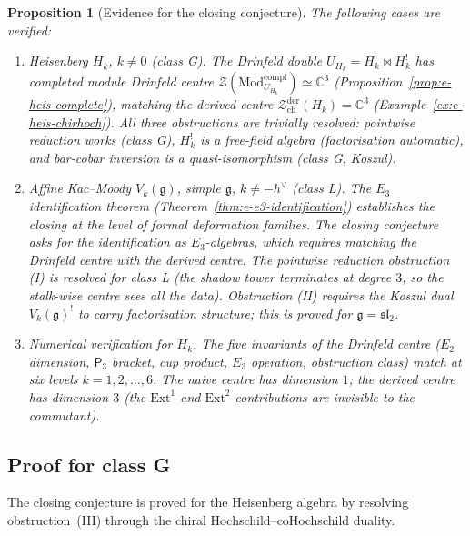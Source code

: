 \documentclass[11pt,reqno]{amsart}
\newtheorem{proposition}[theorem]{Proposition}
\theoremstyle{definition}
\theoremstyle{remark}
\providecommand{\cZ}{\mathcal{Z}}
\providecommand{\fg}{\mathfrak{g}}
\providecommand{\Etwo}{E_2}
\providecommand{\Ethree}{E_3}
\providecommand{\Pthree}{\mathsf{P}_3}
\providecommand{\bC}{\mathbb{C}}
\begin{document}
\begin{proposition}[Evidence for the closing conjecture]
\label{prop:e-evidence}
The following cases are verified:
\begin{enumerate}[label=\textup{(\roman*)}]
\item \emph{Heisenberg $H_k$, $k \neq 0$
 \textup{(}class G\textup{)}.}
 The Drinfeld double $U_{H_k} = H_k \bowtie H_k^!$ has
 completed module Drinfeld centre
 \(\mathcal Z(\mathrm{Mod}^{\mathrm{compl}}_{U_{H_k}})\simeq \bC^3\)
 (Proposition~\ref{prop:e-heis-complete}), matching the derived centre
 $\cZ^{\mathrm{der}}_{\mathrm{ch}}(H_k) = \bC^3$
 (Example~\ref{ex:e-heis-chirhoch}). All three obstructions
 are trivially resolved: pointwise reduction works (class G),
 $H_k^!$ is a free-field algebra (factorisation automatic),
 and bar-cobar inversion is a quasi-isomorphism (class G,
 Koszul).

\item \emph{Affine Kac--Moody $V_k(\fg)$, simple $\fg$,
 $k \neq -h^\vee$ \textup{(}class L\textup{)}.}
 The $\Ethree$ identification theorem
 (Theorem~\ref{thm:e-e3-identification}) establishes the
 closing at the level of formal deformation families. The
 closing conjecture asks for the identification as
 $\Ethree$-algebras, which requires matching the
 Drinfeld centre with the derived centre. The pointwise
 reduction obstruction (I) is resolved for class L (the
 shadow tower terminates at degree $3$, so the stalk-wise
 centre sees all the data). Obstruction (II) requires the
 Koszul dual $V_k(\fg)^!$ to carry factorisation structure;
 this is proved for $\fg = \mathfrak{sl}_2$.

\item \emph{Numerical verification for $H_k$.}
 The five invariants of the Drinfeld centre
 ($\Etwo$ dimension, $\Pthree$ bracket, cup product,
 $\Ethree$ operation, obstruction class) match at six
 levels $k = 1, 2, \ldots, 6$. The naive centre has
 dimension $1$; the derived centre has dimension $3$
 (the $\mathrm{Ext}^1$ and $\mathrm{Ext}^2$
 contributions are invisible to the commutant).
\end{enumerate}
\end{proposition}

\subsection{Proof for class G}

The closing conjecture is proved for the Heisenberg algebra
by resolving obstruction~(III) through the chiral
Hochschild--coHochschild duality.
\end{document}
